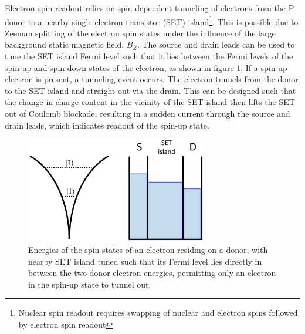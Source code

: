 \documentclass[../Thesis.tex]{subfiles}
\begin{document}
Electron spin readout relies on spin-dependent tunneling of electrons from the P donor to a nearby single electron transistor (SET) island\footnote{Nuclear spin readout requires swapping of nuclear and electron spins followed by electron spin readout}. This is possible due to Zeeman splitting of the electron spin states under the influence of the large background static magnetic field, $B_Z$. The source and drain leads can be used to tune the SET island Fermi level such that it lies between the Fermi levels of the spin-up and spin-down states of the electron, as shown in figure \ref{fig:readout-levels}. If a spin-up electron is present, a tunneling event occurs. The electron tunnels from the donor to the SET island and straight out via the drain. This can be designed such that the change in charge content in the vicinity of the SET island then lifts the SET out of Coulomb blockade, resulting in a sudden current through the source and drain leads, which indicates readout of the spin-up state.

\begin{figure}
    \centering
    \includegraphics[width=8cm]{graphics/Introduction/readout_levels.PNG}
    \caption{Energies of the spin states of an electron residing on a donor, with nearby SET island tuned such that its Fermi level lies directly in between the two donor electron energies, permitting only an electron in the spin-up state to tunnel out.}
    \label{fig:readout-levels}
\end{figure}
\end{document}
